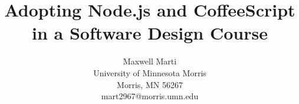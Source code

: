 \documentclass[12pt]{article}
\newcommand{\comment}[1]{{\bf \tt  {#1}}}
\begin{document}
\pagestyle{plain}
%




\title{Adopting Node.js and CoffeeScript in a Software Design Course}
%
%




\author{
Maxwell Marti \\
University of Minnesota Morris\\
Morris, MN 56267\\
mart2967@morris.umn.edu
}




\date{}




\maketitle
\thispagestyle{empty}
\end{document}

